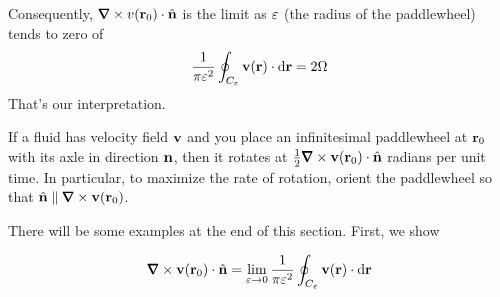 Consequently, $\vnabla\times v(\vr_0)\cdot \hn$ is the limit
as $\varepsilon$ (the radius of the paddlewheel) tends to zero of
\begin{align*}
\frac{1}{\pi\varepsilon^2}
         \oint_{C_\varepsilon} \mathbf{v}(\mathbf{r})\cdot \mathrm{d}\mathbf{r}
=2\Omega
\end{align*}
That's our interpretation.
\begin{impeqn}\label{eq:curlInterp}
If a fluid has velocity field $\mathbf{v}$ and you place an infinitesimal
paddlewheel at $\mathbf{r}_0$ with its axle in direction $\mathbf{n}$, then it rotates
at $\frac{1}{2}\vnabla\times \vv(\vr_0)\cdot \hn$ radians per unit time.
In particular, to maximize the rate of rotation, orient the paddlewheel so that
$\hn\parallel\vnabla\times \vv(\vr_0)$.
\end{impeqn}

There will be some examples at the end of this section.
First, we show

\begin{lemma}\label{lem:curlInterp}
\begin{equation*}
\vnabla\times \vv(\vr_0)\cdot \hn
=\lim_{\veps\rightarrow 0}\frac{1}{\pi\veps^2}
         \oint_{C_\veps} \vv(\vr)\cdot \dee{\vr}
\end{equation*}
\end{lemma}

